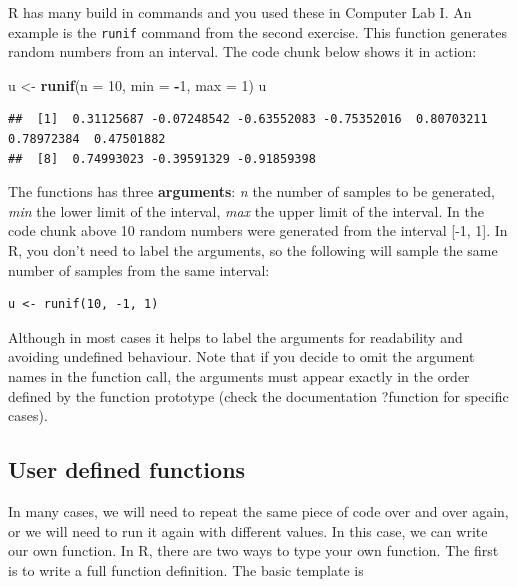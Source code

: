 \documentclass[
]{book}
\newenvironment{Shaded}{\begin{snugshade}}{\end{snugshade}}
\newcommand{\AttributeTok}[1]{\textcolor[rgb]{0.13,0.29,0.53}{#1}}
\newcommand{\DecValTok}[1]{\textcolor[rgb]{0.00,0.00,0.81}{#1}}
\newcommand{\FunctionTok}[1]{\textcolor[rgb]{0.13,0.29,0.53}{\textbf{#1}}}
\newcommand{\NormalTok}[1]{#1}
\newcommand{\OtherTok}[1]{\textcolor[rgb]{0.56,0.35,0.01}{#1}}
\newcommand{\SpecialCharTok}[1]{\textcolor[rgb]{0.81,0.36,0.00}{\textbf{#1}}}
\theoremstyle{definition}
\theoremstyle{definition}
\theoremstyle{definition}
\theoremstyle{definition}
\theoremstyle{remark}
\begin{document}
R has many build in commands and you used these in Computer Lab I. An example is the \texttt{runif} command from the second exercise. This function generates random numbers from an interval. The code chunk below shows it in action:

\begin{Shaded}
\begin{Highlighting}[]
\NormalTok{u }\OtherTok{\textless{}{-}} \FunctionTok{runif}\NormalTok{(}\AttributeTok{n =} \DecValTok{10}\NormalTok{, }\AttributeTok{min =} \SpecialCharTok{{-}}\DecValTok{1}\NormalTok{, }\AttributeTok{max =} \DecValTok{1}\NormalTok{)}
\NormalTok{u}
\end{Highlighting}
\end{Shaded}

\begin{verbatim}
##  [1]  0.31125687 -0.07248542 -0.63552083 -0.75352016  0.80703211  0.78972384  0.47501882
##  [8]  0.74993023 -0.39591329 -0.91859398
\end{verbatim}

The functions has three \textbf{arguments}: \emph{n} the number of samples to be generated, \emph{min} the lower limit of the interval, \emph{max} the upper limit of the interval. In the code chunk above 10 random numbers were generated from the interval {[}-1, 1{]}. In R, you don't need to label the arguments, so the following will sample the same number of samples from the same interval:

\begin{verbatim}
u <- runif(10, -1, 1)
\end{verbatim}

Although in most cases it helps to label the arguments for readability and avoiding undefined behaviour. Note that if you decide to omit the argument names in the function call, the arguments must appear exactly in the order defined by the function prototype (check the documentation ?function for specific cases).

\hypertarget{user-defined-functions}{%
\subsection{User defined functions}\label{user-defined-functions}}

In many cases, we will need to repeat the same piece of code over and over again, or we will need to run it again with different values. In this case, we can write our own function. In R, there are two ways to type your own function. The first is to write a full function definition. The basic template is
\end{document}
